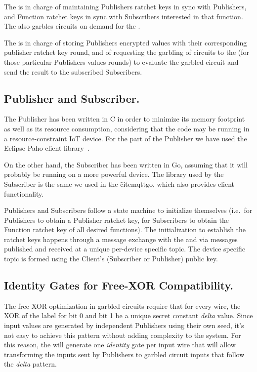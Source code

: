 The \garbler is in charge of maintaining Publishers ratchet keys in sync
with Publishers, and Function ratchet keys in sync with Subscribers interested
in that function.  The \garbler also garbles circuits on demand for the
\broker.

The \broker is in charge of storing Publishers encrypted values with their
corresponding publisher ratchet key round, and of requesting the garbling of
circuits to the \garbler (for those particular Publishers values rounds) to
evaluate the garbled circuit and send the result to the subscribed Subscribers.

\vspace{-4pt}
\subsection{Publisher and Subscriber.}

The Publisher has been written in C in order to minimize its memory footprint
as well as its resource consumption, considering that the code may be running
in a resource-constraint IoT device.  For the \MQTT{} part of the Publisher we
have used the Eclipse Paho client library~\cite{paho}.

On the other hand, the Subscriber has been written in Go, assuming that it
will probably be running on a more powerful device.  The \MQTT{} library used
by the Subscriber is the same we used in the \broker\~cite{mqttgo}, which also
provides client functionality.

Publishers and Subscribers follow a state machine to initialize themselves
(i.e.\ for Publishers to obtain a Publisher ratchet key, for Subscribers to
obtain the Function ratchet key of all desired functions).  The initialization
to establish the ratchet keys happens through a message exchange with the
\broker and \garbler via \MQTT{} messages published and received at a unique
per-device specific topic.  The device specific topic is formed using the
Client's (Subscriber or Publisher) public key.

\vspace{-4pt}
\subsection{Identity Gates for Free-XOR Compatibility.}

The free XOR optimization in garbled circuits require that for every wire, the
XOR of the label for bit 0 and bit 1 be a unique secret constant \emph{delta}
value.  Since input values are generated by independent Publishers using their
own seed, it's not easy to achieve this pattern without adding complexity to
the system.  For this reason, the \garbler will generate one \emph{identity}
gate per input wire that will allow transforming the inputs sent by Publishers
to garbled circuit inputs that follow the \emph{delta} pattern.

